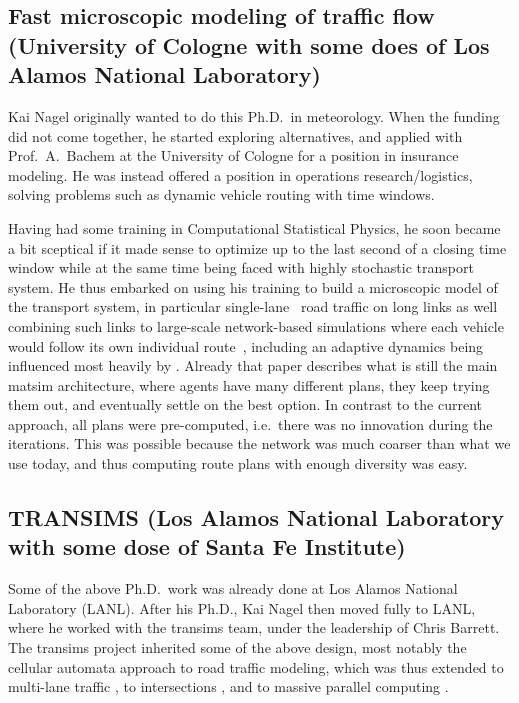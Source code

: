 
\subsection{Fast microscopic modeling of traffic flow (University of Cologne with some does of Los Alamos National Laboratory)}
\label{sec:history-u-of-cologne-phase}

Kai Nagel originally wanted to do this Ph.D.\ in meteorology.  When the funding did not come together, he started exploring alternatives, and applied with Prof.\ A.\ Bachem at the University of Cologne for a position in insurance modeling.  He was instead offered a position in operations research/logistics, solving problems such as dynamic vehicle routing with time windows. 

Having had some training in Computational Statistical Physics, he soon became a bit sceptical if it made sense to optimize up to the last second of a closing time window while at the same time being faced with highly stochastic transport system.  He thus embarked on using his training to build a microscopic model of the transport system, in particular single-lane~\citep{NagelSchreckenberg1992CA,Nagel1999flowTheoTrr} road traffic on long links as well combining such links to large-scale network-based simulations where each vehicle would follow its own individual route~\citep{Nagel1996NRW}, including an adaptive dynamics being influenced most heavily by \cite{ArthurBar}.  Already that paper describes what is still the main \gls{matsim} architecture, where agents have many different plans, they keep trying them out, and eventually settle on the best option.  In contrast to the current approach, all plans were pre-computed, i.e.\ there was no innovation during the iterations.  This was possible because the network was much coarser than what we use today, and thus computing route plans with enough diversity was easy.

\subsection{TRANSIMS (Los Alamos National Laboratory with some dose of Santa Fe Institute)}
\label{sec:history-lanl-phase}

Some of the above Ph.D.\ work was already done at Los Alamos National Laboratory (LANL).  After his Ph.D., Kai Nagel then moved fully to LANL, where he worked with the \gls{transims} \citep[e.g.,][]{SmithEtc1995TRANSIMSSeattle} team, under the leadership of Chris Barrett.
%
The \gls{transims} project inherited some of the above design, most notably the cellular automata approach to road traffic modeling, which was thus extended to multi-lane traffic \citep{NagelWolfEtAl1998TwoLaneSystematic}, to intersections \citep{NagelEtc1997flow-char}, and to massive parallel computing \citep{NagelRickert2001parallel}.

